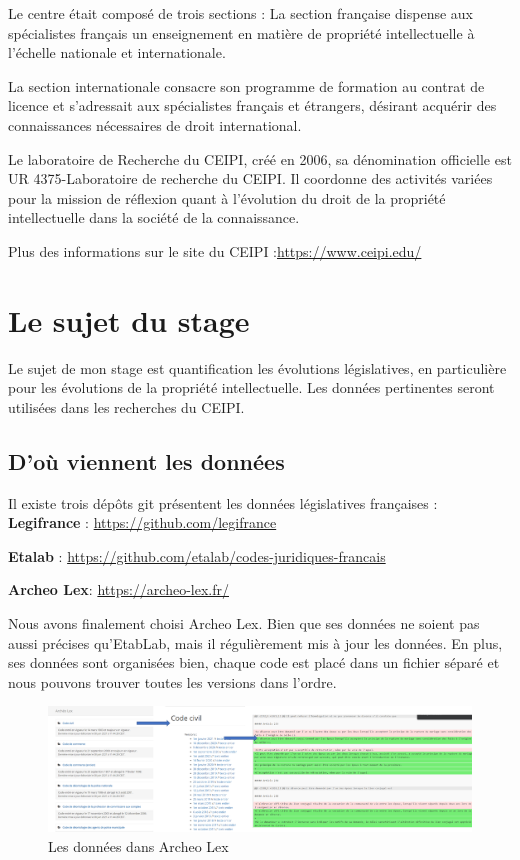 \documentclass[
  oneside]{book}
\begin{document}
Le centre était composé de trois sections :
La section française dispense aux spécialistes français un enseignement en matière de propriété intellectuelle à l'échelle nationale et internationale.

La section internationale consacre son programme de formation au contrat de licence et s'adressait aux spécialistes français et étrangers, désirant acquérir des connaissances nécessaires de droit international.

Le laboratoire de Recherche du CEIPI, créé en 2006, sa dénomination officielle est UR 4375-Laboratoire de recherche du CEIPI. Il coordonne des activités variées pour la mission de réflexion quant à l'évolution du droit de la propriété intellectuelle dans la société de la connaissance.

Plus des informations sur le site du CEIPI :\url{https://www.ceipi.edu/}

\hypertarget{Sujet}{%
\chapter{Le sujet du stage}\label{Sujet}}

Le sujet de mon stage est quantification les évolutions législatives, en particulière pour les évolutions de la propriété intellectuelle. Les données pertinentes seront utilisées dans les recherches du CEIPI.

\hypertarget{douxf9-viennent-les-donnuxe9es}{%
\section{D'où viennent les données}\label{douxf9-viennent-les-donnuxe9es}}

Il existe trois dépôts git présentent les données législatives françaises :
\textbf{Legifrance} : \url{https://github.com/legifrance}

\textbf{Etalab} : \url{https://github.com/etalab/codes-juridiques-francais}

\textbf{Archeo Lex}: \url{https://archeo-lex.fr/}

Nous avons finalement choisi Archeo Lex. Bien que ses données ne soient pas aussi précises qu'EtabLab, mais il régulièrement mis à jour les données. En plus, ses données sont organisées bien, chaque code est placé dans un fichier séparé et nous pouvons trouver toutes les versions dans l'ordre.

\begin{figure}

{\centering \includegraphics[width=27.28in]{images/archeoLex_Structure} 

}

\caption{Les données dans Archeo Lex}\label{fig:ArcheoLex}
\end{figure}
\end{document}
